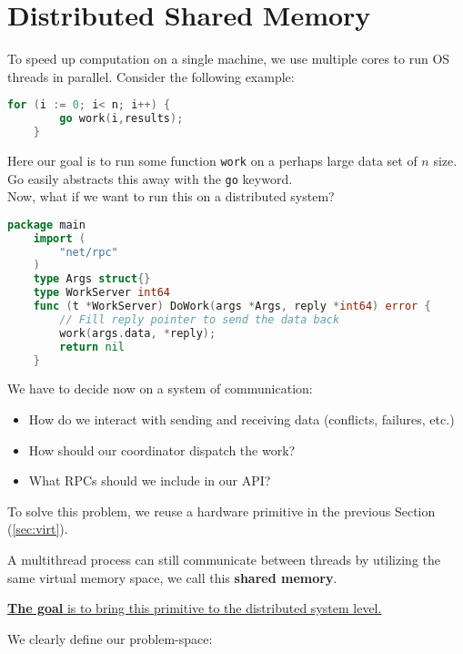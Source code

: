 \newpage
\section{Distributed Shared Memory}
To speed up computation on a single machine, we use multiple cores to 
run OS threads in parallel. Consider the following example:

\begin{lstlisting}[language=Go]
    for (i := 0; i< n; i++) {
        go work(i,results);
    }  
\end{lstlisting}

\noindent
Here our goal is to run some function \texttt{work} on a perhaps large 
data set of $n$ size. Go easily abstracts this away with the \texttt{go} keyword.\\

\noindent
Now, what if we want to run this on a distributed system?

\begin{lstlisting}[language=Go]
    package main
    import (
        "net/rpc"
    )
    type Args struct{}
    type WorkServer int64
    func (t *WorkServer) DoWork(args *Args, reply *int64) error {
        // Fill reply pointer to send the data back
        work(args.data, *reply);
        return nil
    }
\end{lstlisting}

\noindent
We have to decide now on a system of communication:
\begin{itemize}
    \item How do we interact with sending and receiving data (conflicts, failures, etc.)
    \item How should our coordinator dispatch the work?
    \item What RPCs should we include in our API?
\end{itemize}

\noindent
To solve this problem, we reuse a hardware primitive in the previous Section (\ref{sec:virt}).
\begin{theo}

    A multithread process can still communicate between threads by utilizing the same virtual memory space, we call this \textbf{shared memory}.
\end{theo}
\noindent
\underline{\textbf{The goal} is to bring this primitive to the distributed system level.}

\newpage 

\noindent
We clearly define our problem-space:

